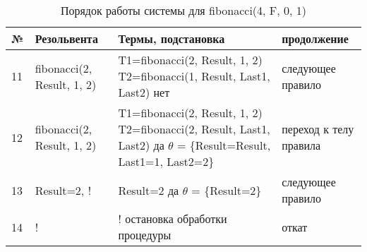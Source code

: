\begin{table}[h]
	\begin{center}
		\begin{threeparttable}
			\captionsetup{justification=raggedright,singlelinecheck=off}
			\caption{Порядок работы системы для fibonacci(4, F, 0, 1)}
			\begin{tabular}{|m{0.5cm}|m{3.5cm}|m{8.5cm}|m{3cm}|}
				\hline
				№ & Резольвента &Термы, подстановка & продолжение \\
				\hline
				11 & fibonacci(2, Result, 1, 2) & T1=fibonacci(2, Result, 1, 2) \newline T2=fibonacci(1, Result, Last1, Last2) \newline нет & следующее правило \\
				\hline
				12 & fibonacci(2, Result, 1, 2) & T1=fibonacci(2, Result, 1, 2) \newline T2=fibonacci(2, Result, Last1, Last2) \newline да \newline $\theta$ = \{Result=Result, Last1=1, Last2=2\} & переход к \newline телу правила \\
				\hline
				13 & Result=2, \newline ! & Result=2 \newline да \newline $\theta$ = \{Result=2\} & следующее правило \\
				\hline
				14 & ! & ! \newline остановка обработки процедуры & откат \\
				\hline
			\end{tabular}
		\end{threeparttable}
	\end{center}
\end{table}
